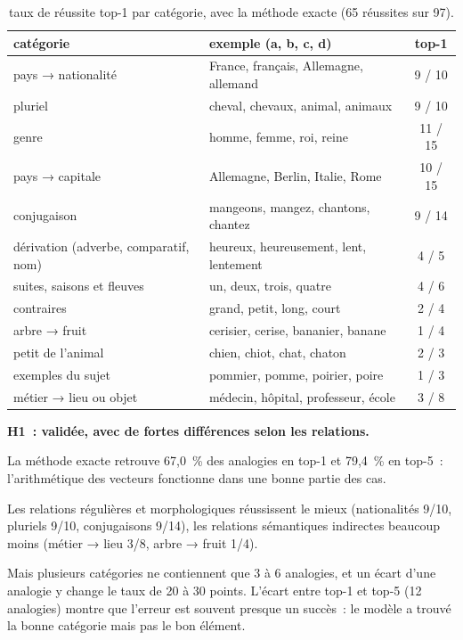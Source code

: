 \documentclass[11pt,a4paper]{article}
\begin{document}
\begin{table}[!htbp]
\centering
\small
\caption{taux de réussite top-1 par catégorie, avec la méthode exacte (65 réussites sur 97).}
\begin{tabular}{llc}
\toprule
\textbf{catégorie} & \textbf{exemple (a, b, c, d)} & \textbf{top-1} \\
\midrule
pays → nationalité & France, français, Allemagne, allemand & 9 / 10 \\
pluriel & cheval, chevaux, animal, animaux & 9 / 10 \\
genre & homme, femme, roi, reine & 11 / 15 \\
pays → capitale & Allemagne, Berlin, Italie, Rome & 10 / 15 \\
conjugaison & mangeons, mangez, chantons, chantez & 9 / 14 \\
dérivation (adverbe, comparatif, nom) & heureux, heureusement, lent, lentement & 4 / 5 \\
suites, saisons et fleuves & un, deux, trois, quatre & 4 / 6 \\
contraires & grand, petit, long, court & 2 / 4 \\
arbre → fruit & cerisier, cerise, bananier, banane & 1 / 4 \\
petit de l’animal & chien, chiot, chat, chaton & 2 / 3 \\
exemples du sujet & pommier, pomme, poirier, poire & 1 / 3 \\
métier → lieu ou objet & médecin, hôpital, professeur, école & 3 / 8 \\
\bottomrule
\end{tabular}
\end{table}

\textbf{H1~: validée, avec de fortes différences selon les relations.}\nopagebreak

La méthode exacte retrouve 67,0~\% des analogies en top-1 et 79,4~\% en top-5~: l’arithmétique des vecteurs fonctionne dans une bonne partie des cas.

Les relations régulières et morphologiques réussissent le mieux (nationalités 9/10, pluriels 9/10, conjugaisons 9/14), les relations sémantiques indirectes beaucoup moins (métier → lieu 3/8, arbre → fruit 1/4).

Mais plusieurs catégories ne contiennent que 3 à 6 analogies, et un écart d’une analogie y change le taux de 20 à 30 points. L’écart entre top-1 et top-5 (12 analogies) montre que l’erreur est souvent presque un succès~: le modèle a trouvé la bonne catégorie mais pas le bon élément.
\end{document}
